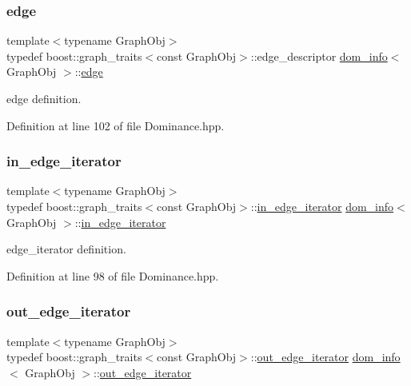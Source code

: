 \subsubsection{\texorpdfstring{edge}{edge}}
{\footnotesize\ttfamily template$<$typename Graph\+Obj$>$ \\
typedef boost\+::graph\+\_\+traits$<$const Graph\+Obj$>$\+::edge\+\_\+descriptor \hyperlink{classdom__info}{dom\+\_\+info}$<$ Graph\+Obj $>$\+::\hyperlink{classdom__info_a61a309b17126a4b52e28adc4b6d1b45a}{edge}\hspace{0.3cm}{\ttfamily [private]}}



edge definition. 



Definition at line 102 of file Dominance.\+hpp.

\mbox{\label{classdom__info_a295dcc01454ddf008ede1c584f7c1f26}} 
\subsubsection{\texorpdfstring{in\+\_\+edge\+\_\+iterator}{in\_edge\_iterator}}
{\footnotesize\ttfamily template$<$typename Graph\+Obj$>$ \\
typedef boost\+::graph\+\_\+traits$<$const Graph\+Obj$>$\+::\hyperlink{classdom__info_a295dcc01454ddf008ede1c584f7c1f26}{in\+\_\+edge\+\_\+iterator} \hyperlink{classdom__info}{dom\+\_\+info}$<$ Graph\+Obj $>$\+::\hyperlink{classdom__info_a295dcc01454ddf008ede1c584f7c1f26}{in\+\_\+edge\+\_\+iterator}\hspace{0.3cm}{\ttfamily [private]}}



edge\+\_\+iterator definition. 



Definition at line 98 of file Dominance.\+hpp.

\mbox{\label{classdom__info_a579f96dd47b2e5aa21a1f875abae54ec}} 
\subsubsection{\texorpdfstring{out\+\_\+edge\+\_\+iterator}{out\_edge\_iterator}}
{\footnotesize\ttfamily template$<$typename Graph\+Obj$>$ \\
typedef boost\+::graph\+\_\+traits$<$const Graph\+Obj$>$\+::\hyperlink{classdom__info_a579f96dd47b2e5aa21a1f875abae54ec}{out\+\_\+edge\+\_\+iterator} \hyperlink{classdom__info}{dom\+\_\+info}$<$ Graph\+Obj $>$\+::\hyperlink{classdom__info_a579f96dd47b2e5aa21a1f875abae54ec}{out\+\_\+edge\+\_\+iterator}\hspace{0.3cm}{\ttfamily [private]}}



